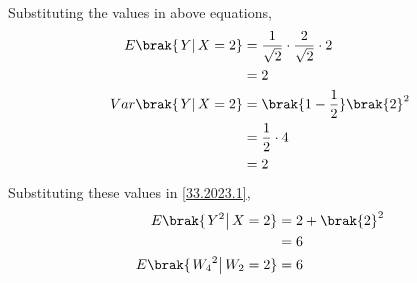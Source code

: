 \documentclass[journal,12pt,twocolumn]{IEEEtran}
\theoremstyle{remark}
\begin{document}
Substituting the values in above equations,
\begin{align}
E\brak{\left.Y\right | X=2} &= \frac{1}{\sqrt{2}}\cdot\frac{2}{\sqrt{2}}\cdot 2\\
			    &= 2\\
Var\brak{\left.Y\right | X=2} &= \brak{1 - \frac{1}{2}}\brak{2}^2\\
			      &= \frac{1}{2}\cdot 4\\
			      &= 2
\end{align}
Substituting these values in \eqref{33.2023.1},
\begin{align}
E\brak{\left.Y^2\right | X=2} &= 2 + \brak{2}^2\\
			      &= 6\\
E\brak{\left.{W_4}^2\right | W_2=2} &= 6
\end{align}
\end{document}
